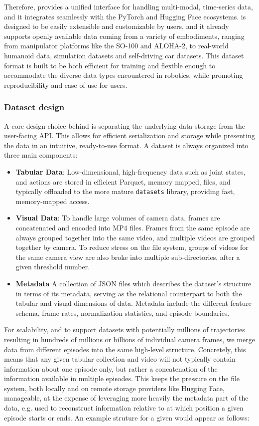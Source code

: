 Therefore, \lerobotdataset provides a unified interface for handling multi-modal, time-series data, and it integrates seamlessly with the PyTorch and Hugging Face ecosystems. 
\lerobotdataset is designed to be easily extensible and customizable by users, and it already supports openly available data coming from a variety of embodiments, ranging from manipulator platforms like the SO-100 and ALOHA-2, to real-world humanoid data, simulation datasets and self-driving car datasets.
This dataset format is built to be both efficient for training and flexible enough to accommodate the diverse data types encountered in robotics, while promoting reproducibility and ease of use for users. 

\subsubsection{Dataset design}

A core design choice behind \lerobotdataset is separating the underlying data storage from the user-facing API.
This allows for efficient serialization and storage while presenting the data in an intuitive, ready-to-use format.
A dataset is always organized into three main components:
\begin{itemize}
\item \textbf{Tabular Data}: Low-dimensional, high-frequency data such as joint states, and actions are stored in efficient Parquet, memory mapped, files, and typically offloaded to the more mature \texttt{datasets} library, providing fast, memory-mapped access.
\item \textbf{Visual Data}: To handle large volumes of camera data, frames are concatenated and encoded into MP4 files. Frames from the same episode are always grouped together into the same video, and multiple videos are grouped together by camera. To reduce stress on the file system, groups of videos for the same camera view are also broke into multiple sub-directories, after a given threshold number.
\item \textbf{Metadata} A collection of JSON files which describes the dataset's structure in terms of its metadata, serving as the relational counterpart to both the tabular and visual dimensions of data. Metadata include the different feature schema, frame rates, normalization statistics, and episode boundaries.
\end{itemize}

For scalability, and to support datasets with potentially millions of trajectories resulting in hundreds of millions or billions of individual camera frames, we merge data from different episodes into the same high-level structure.
Concretely, this means that any given tabular collection and video will not typically contain information about one episode only, but rather a concatenation of the information available in multiple episodes.
This keeps the pressure on the file system, both locally and on remote storage providers like Hugging Face, manageable, at the expense of leveraging more heavily the metadata part of the data, e.g. used to reconstruct information relative to at which position a given episode starts or ends.
An example struture for a given \lerobotdataset would appear as follows:

